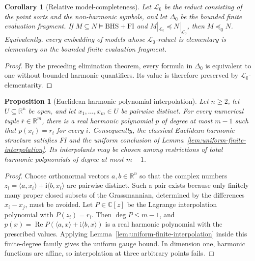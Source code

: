 \documentclass{amsart}
\newtheorem{proposition}[theorem]{Proposition}
\newtheorem{corollary}[theorem]{Corollary}
\theoremstyle{definition}
\theoremstyle{remark}
\numberwithin{equation}{section}
\begin{document}
\begin{corollary}[Relative model-completeness]
	\label{cor:relative-model-completeness}
	Let $\mathcal L_0$ be the reduct consisting of the point sorts and the non-harmonic symbols, and let $\Delta_{0}$ be the bounded
	finite evaluation fragment.  If $M\subseteq N\models\mathrm{BHS}+\mathrm{FI}$ and
	$M|_{\mathcal L_0}\preccurlyeq N|_{\mathcal L_0}$, then $M\preccurlyeq_{0}N$.
	Equivalently, every embedding of models whose $\mathcal L_0$-reduct is elementary is elementary on the bounded finite evaluation fragment.
\end{corollary}

\begin{proof}
	By the preceding elimination theorem, every formula in
	$\Delta_{0}$ is equivalent to one without bounded harmonic
	quantifiers.  Its value is therefore preserved by
	$\mathcal L_0$-elementarity.
\end{proof}

\begin{proposition}[Euclidean harmonic-polynomial interpolation]
	\label{prop:harmonic-polynomial-FI}
	Let $n\ge2$, let $U\subseteq\mathbb R^n$ be open, and let $x_1,\ldots,x_m\in U$ be pairwise distinct. For every numerical tuple $\bar r\in\mathbb R^m$, there is a real harmonic polynomial $p$ of degree at most $m-1$ such that $p(x_i)=r_i$ for every $i$. Consequently, the classical Euclidean harmonic structure satisfies FI and the uniform conclusion of Lemma~\ref{lem:uniform-finite-interpolation}. Its interpolants may be chosen among restrictions of total harmonic polynomials of degree at most $m-1$.
\end{proposition}

\begin{proof}
	Choose orthonormal vectors $a,b\in\mathbb R^n$ so that the complex numbers $z_i=\langle a,x_i\rangle+\mathrm{i}\langle b,x_i\rangle$ are pairwise distinct. Such a pair exists because only finitely many proper closed subsets of the Grassmannian, determined by the differences $x_i-x_j$, must be avoided. Let $P\in\mathbb C[z]$ be the Lagrange interpolation polynomial with $P(z_i)=r_i$. Then $\deg P\le m-1$, and
	$p(x)=\operatorname{Re}P(\langle a,x\rangle+\mathrm{i}\langle b,x\rangle)$
	is a real harmonic polynomial with the prescribed values. Applying Lemma~\ref{lem:uniform-finite-interpolation} inside this finite-degree family gives the uniform gauge bound. In dimension one, harmonic functions are affine, so interpolation at three arbitrary points fails.
\end{proof}
\end{document}
